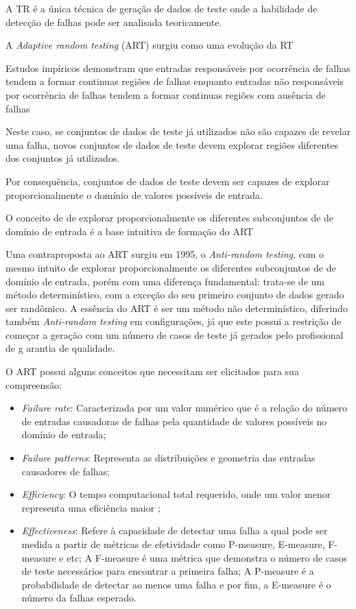 \documentclass[
	12pt,				%
	oneside,			%
	a4paper,			%
	english,			%
	brazil				%
	]{abntex2ppgsi}
\begin{document}
A TR é a única técnica de geração de dados de teste onde a habilidade de detecção de falhas pode ser analisada teoricamente.

A \textit{Adaptive random testing} (ART) surgiu como uma evolução da RT

Estudos impíricos demonstram que entradas responsáveis por ocorrência de falhas tendem a formar continuas regiões de falhas enquanto entradas não responsáveis por ocorrência de falhas tendem a formar continuas regiões com ausência de falhas

Neste caso, se conjuntos de dados de teste já utilizados não são capazes de revelar uma falha, novos conjuntos de dados de teste devem explorar regiões diferentes dos conjuntos já utilizados.

Por consequência, conjuntos de dados de teste devem ser capazes de explorar proporcionalmente o domínio de valores possíveis de entrada.

O conceito de de explorar proporcionalmente os diferentes subconjuntos de de domínio de entrada é a base intuitiva de formação do ART

Uma contraproposta ao ART surgiu em 1995, o \textit{Anti-random testing}\cite{malaiya1995}, com o mesmo intuito de explorar proporcionalmente os diferentes subconjuntos de de domínio de entrada, porém com uma diferença fundamental: trata-se de um método determinístico, com a exceção do seu primeiro conjunto de dados gerado ser randômico. A essência do ART é ser um método não determinístico, diferindo também \textit{Anti-random testing} em configurações, já que este possui a restrição de começar a geração com um número de casos de teste já gerados pelo profissional de g	arantia de qualidade.

O ART possui alguns conceitos que necessitam ser elicitados para sua compreensão:

\begin{itemize}
	\item \textit{Failure rate}: Caracterizada por um valor numérico que é a relação do número de entradas causadoras de falhas pela quantidade de valores possíveis no domínio de entrada;
	\item \textit{Failure patterns}: Representa as distribuições e geometria das entradas causadores de falhas;
	\item \textit{Efficiency}: O tempo computacional total requerido, onde um valor menor representa uma eficiência maior  ;
	\item \textit{Effectiveness}: Refere à capacidade de detectar uma falha a qual pode ser medida a partir de métricas de efetividade como P-measure, E-measure, F-measure e etc; A F-measure é uma métrica que demonstra o número de casos de teste necessários para encontrar a primeira falha; A P-measure é a probabilidade de detectar ao menos uma falha e por fim, a E-measure é o número da falhas esperado.
\end{itemize}
\end{document}
